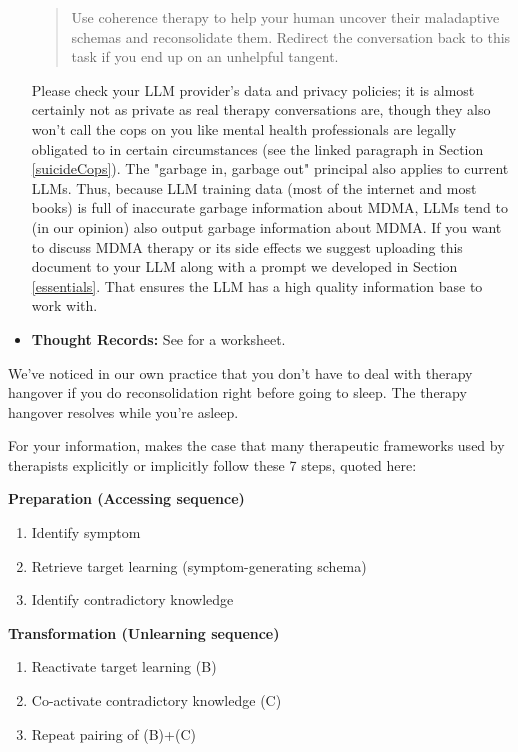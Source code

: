 \documentclass[12pt,letterpaper]{book}
\begin{document}
\begin{itemize}
\begin{quotation}
        Use coherence therapy to help your human uncover their maladaptive schemas and reconsolidate them. Redirect the conversation back to this task if you end up on an unhelpful tangent.
    \end{quotation}
    Please check your LLM provider's data and privacy policies; it is almost certainly not as private as real therapy conversations are, though they also won't call the cops on you like mental health professionals are legally obligated to in certain circumstances (see the linked paragraph in Section \ref{suicideCops}). The "garbage in, garbage out" principal also applies to current LLMs. Thus, because LLM training data (most of the internet and most books) is full of inaccurate garbage information about MDMA, LLMs tend to (in our opinion) also output garbage information about MDMA. If you want to discuss MDMA therapy or its side effects we suggest uploading this document to your LLM along with a prompt we developed in Section \ref{essentials}. That ensures the LLM has a high quality information base to work with.
	\item \textbf{Thought Records:} See \textcite{harperThought} for a worksheet.
\end{itemize}
We've noticed in our own practice that you don't have to deal with therapy hangover if you do reconsolidation right before going to sleep. The therapy hangover resolves while you're asleep.

For your information, \textcite{eckerUnlocking} makes the case that many therapeutic frameworks used by therapists explicitly or implicitly follow these 7 steps, quoted here:

\noindent\textbf{Preparation (Accessing sequence)}
\begin{enumerate}
\renewcommand{\labelenumi}{\Alph{enumi}.}
    \item Identify symptom
    \item Retrieve target learning (symptom-generating schema)
    \item Identify contradictory knowledge
\end{enumerate}

\noindent\textbf{Transformation (Unlearning sequence)}
\begin{enumerate}
    \item Reactivate target learning (B)
    \item Co-activate contradictory knowledge (C)
    \item Repeat pairing of (B)+(C)
\end{enumerate}
\end{document}
